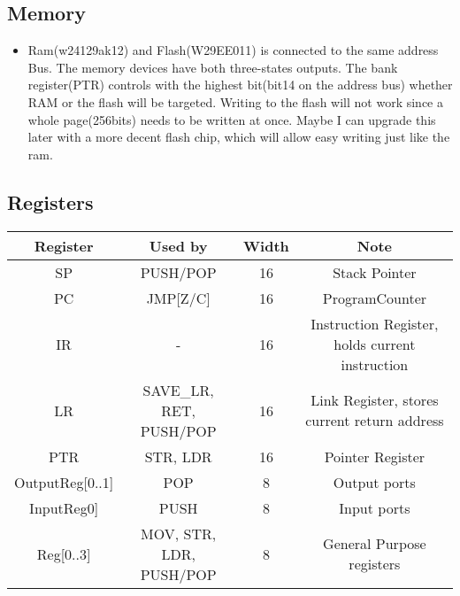 \documentclass[a4paper, 12pt]{article}
\begin{document}
	\subsection{Memory}
	\begin{itemize}
		\item Ram(w24129ak12) and Flash(W29EE011) is connected to the same address Bus. The memory devices have both three-states outputs. The bank register(PTR) controls with the highest bit(bit14 on the address bus) whether RAM or the flash will be targeted. Writing to the flash will not work since a whole page(256bits) needs to be written at once. Maybe I can upgrade this later with a more decent flash chip, which will allow easy writing just like the ram.
	\end{itemize}

	\subsection {Registers}
	\tiny\begin{center}
		\begin{tabular}{|c|c|c|c|}
			\hline
			Register & Used by & Width & Note\\ \hline
			SP & PUSH/POP & 16 & Stack Pointer\\ \hline
			PC & JMP[Z/C] & 16 & ProgramCounter\\ \hline
			IR & - & 16 & Instruction Register, holds current instruction\\ \hline
			LR & SAVE\_LR, RET, PUSH/POP & 16 &  Link Register, stores current return address\\ \hline
			PTR & STR, LDR & 16 & Pointer Register\\\hline
			OutputReg[0..1] & POP & 8 & Output ports\\ \hline
			InputReg0] & PUSH & 8 & Input ports\\ \hline
			Reg[0..3] & MOV, STR, LDR, PUSH/POP & 8 & General Purpose registers\\ \hline
		\end{tabular}
	\end{center}
	\newpage
\end{document}
